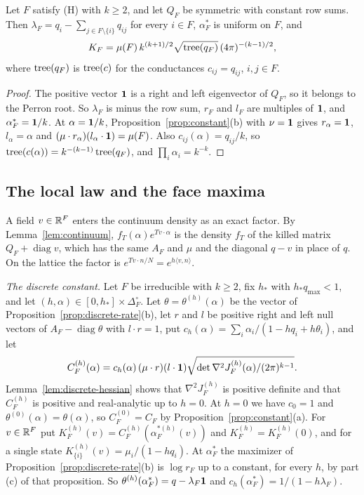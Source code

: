 \begin{corollary}\label{cor:symface}
Let $F$ satisfy \textup{(H)} with $k\ge2$, and let $Q_F$ be symmetric with constant row sums.
Then $\lambda_F=q_i-\sum_{j\in F\setminus\{i\}}q_{ij}$ for every $i\in F$, $\alpha^*_F$ is uniform
on $F$, and
\[
K_F=\mu(F)\,k^{(k+1)/2}\sqrt{\operatorname{tree}(q_F)}\,(4\pi)^{-(k-1)/2},
\]
where $\operatorname{tree}(q_F)$ is $\operatorname{tree}(c)$ for the conductances $c_{ij}=q_{ij}$, $i,j\in F$.
\end{corollary}

\begin{proof}
The positive vector $\mathbf{1}$ is a right and left eigenvector of $Q_F$, so it belongs to the
Perron root. So $\lambda_F$ is minus the row sum, $r_F$ and $l_F$ are multiples of $\mathbf{1}$, and
$\alpha^*_F=\mathbf{1}/k$.
At $\alpha=\mathbf{1}/k$, Proposition~\ref{prop:constant}(b) with $\nu=\mathbf{1}$ gives
$r_\alpha=\mathbf{1}$, $l_\alpha=\alpha$ and $(\mu\cdot r_\alpha)(l_\alpha\cdot\mathbf{1})=\mu(F)$.
Also $c_{ij}(\alpha)=q_{ij}/k$, so $\operatorname{tree}(c(\alpha))=k^{-(k-1)}\operatorname{tree}(q_F)$, and
$\prod_i\alpha_i=k^{-k}$.
\end{proof}

\subsection{The local law and the face maxima}\label{sec:locallaw}

A field $v\in\mathbb{R}^F$ enters the continuum density as an exact factor. By
Lemma~\ref{lem:continuum}, $f_T(\alpha)e^{Tv\cdot\alpha}$ is the density $f_T$ of
the killed matrix $Q_F+\operatorname{diag}v$, which has the same $A_F$ and $\mu$ and
the diagonal $q-v$ in place of $q$. On the lattice the factor is
$e^{Tv\cdot n/N}=e^{h\langle v,n\rangle}$.

\emph{The discrete constant.} Let $F$ be irreducible with $k\ge2$, fix $h_*$ with
$h_*q_{\max}<1$, and let
$(h,\alpha)\in[0,h_*]\times\Delta_F^\circ$. Let $\theta=\theta^{(h)}(\alpha)$ be the
vector of Proposition~\ref{prop:discrete-rate}(b), let $r$ and $l$ be positive right
and left null vectors of $A_F-\operatorname{diag}\theta$ with $l\cdot r=1$, put
$c_h(\alpha)=\sum_i\alpha_i/(1-hq_i+h\theta_i)$, and let
\[
 C^{(h)}_F(\alpha)=c_h(\alpha)\,(\mu\cdot r)(l\cdot\mathbf{1})
 \sqrt{\det\nabla^2J^{(h)}_F(\alpha)/(2\pi)^{k-1}} .
\]
Lemma~\ref{lem:discrete-hessian} shows that $\nabla^2J^{(h)}_F$ is positive definite
and that $C^{(h)}_F$ is positive and real-analytic up to $h=0$. At $h=0$ we have
$c_0=1$ and $\theta^{(0)}(\alpha)=\theta(\alpha)$, so $C^{(0)}_F=C_F$ by
Proposition~\ref{prop:constant}(a). For $v\in\mathbb{R}^F$ put
$K^{(h)}_F(v)=C^{(h)}_F(\alpha^{*(h)}_F(v))$ and $K^{(h)}_F=K^{(h)}_F(0)$, and for a
single state $K^{(h)}_{\{i\}}(v)=\mu_i/(1-hq_i)$. At $\alpha^*_F$ the maximizer of
Proposition~\ref{prop:discrete-rate}(b) is $\log r_F$ up to a constant, for every
$h$, by part (c) of that proposition. So
$\theta^{(h)}(\alpha^*_F)=q-\lambda_F\mathbf{1}$ and
$c_h(\alpha^*_F)=1/(1-h\lambda_F)$.

